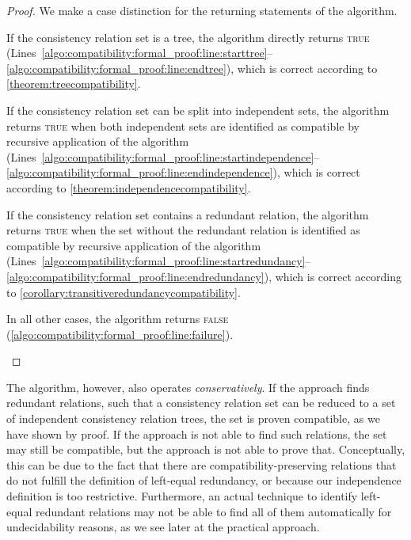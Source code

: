 \begin{proof}
    We make a case distinction for the returning statements of the algorithm.
    \begin{longenumerate}
        \item If the consistency relation set is a tree, the algorithm directly returns \textsc{true} (Lines~\ref{algo:compatibility:formal_proof:line:starttree}--\ref{algo:compatibility:formal_proof:line:endtree}), which is correct according to \autoref{theorem:treecompatibility}.
        \item If the consistency relation set can be split into independent sets, the algorithm returns \textsc{true} when both independent sets are identified as compatible by recursive application of the algorithm (Lines~\ref{algo:compatibility:formal_proof:line:startindependence}--\ref{algo:compatibility:formal_proof:line:endindependence}), which is correct according to \autoref{theorem:independencecompatibility}.
        \item If the consistency relation set contains a redundant relation, the algorithm returns \textsc{true} when the set without the redundant relation is identified as compatible by recursive application of the algorithm (Lines~\ref{algo:compatibility:formal_proof:line:startredundancy}--\ref{algo:compatibility:formal_proof:line:endredundancy}), which is correct according to \autoref{corollary:transitiveredundancycompatibility}.
        \item In all other cases, the algorithm returns \textsc{false} (\autoref{algo:compatibility:formal_proof:line:failure}).
        \qedhere
    \end{longenumerate}
\end{proof}

The algorithm, however, also operates \emph{conservatively}.
If the approach finds redundant relations, such that a consistency relation set can be reduced to a set of independent consistency relation trees, the set is proven compatible, as we have shown by proof.
If the approach is not able to find such relations, the set may still be compatible, but the approach is not able to prove that.
Conceptually, this can be due to the fact that there are compatibility-preserving relations that do not fulfill the definition of left-equal redundancy, or because our independence definition is too restrictive.
Furthermore, an actual technique to identify left-equal redundant relations may not be able to find all of them automatically for undecidability reasons, as we see later at the practical approach.

